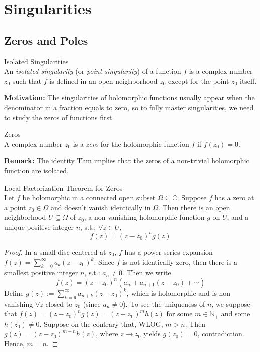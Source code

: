 \chapter{Singularities}

\section{Zeros and Poles}

\begin{definition}{Isolated Singularities}\\
An \textit{isolated singularity} (or \textit{point singularity}) of a function $f$ is a complex number $z_0$ such that $f$ is defined in an open neighborhood $z_0$ except for the point $z_0$ itself.
\end{definition}

\noindent\textbf{Motivation:} The singularities of holomorphic functions usually appear when the denominator in a fraction equals to zero, so to fully master singularities, we need to study the zeros of functions first.

\begin{definition}{Zeros}\\
A complex number $z_0$ is a \textit{zero} for the holomorphic function $f$ if $f(z_0)=0$.
\end{definition}

\noindent\textbf{Remark:} The identity Thm implies that the zeros of a non-trivial holomorphic function are isolated.

\begin{theorem}{Local Factorization Theorem for Zeros}\\
Let $f$ be holomorphic in a connected open subset $\Omega \subseteq \mathbb{C}$. Suppose $f$ has a zero at a point $z_0 \in \Omega$ and doesn't vanish identically in $\Omega$. Then there is an open neighborhood $U\subseteq \Omega$ of $z_0$, a non-vanishing holomorphic function $g$ on $U$, and a unique positive integer $n$, s.t.: $\forall z\in U$,
\[
f(z)= (z-z_0)^n g(z)
\]
\end{theorem}

\begin{proof}
    In a small disc centered at $z_0$, $f$ has a power series expansion $f(z)= \sum_{k=0}^\infty a_k(z-z_0)^k$. Since $f$ is not identically zero, then there is a smallest positive integer $n$, s.t.: $a_n\neq 0$. Then we write
    \[
    f(z)=(z-z_0)^n (a_n+ a_{n+1}(z-z_0)+ \cdots)
    \]
    Define $g(z):= \sum_{k=9}^\infty a_{n+k} (z-z_0)^k$, which is holomorphic and is non-vanishing $\forall z$ closed to $z_0$ (since $a_n \neq 0$). To see the uniqueness of $n$, we suppose that $f(z)= (z-z_0)^n g(z)= (z-z_0)^m h(z)$ for some $m\in \mathbb{N}_+$ and some $h(z_0) \neq 0$. Suppose on the contrary that, WLOG, $m>n$. Then $g(z)= (z-z_0)^{m-n} h(z)$, where $z\to z_0$ yields $g(z_0)=0$, contradiction. Hence, $m=n$.
\end{proof}

